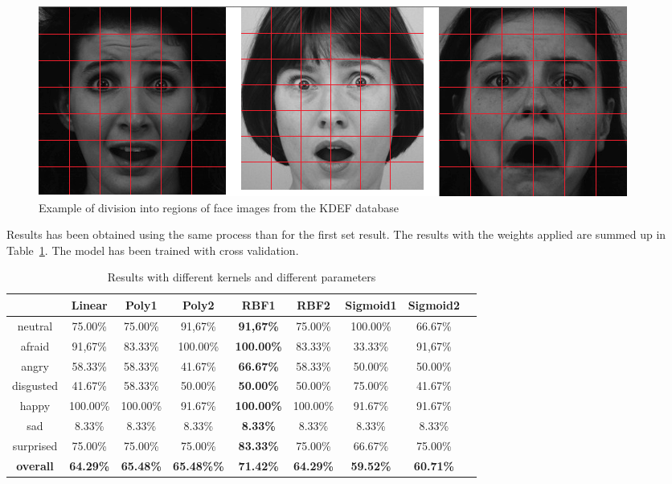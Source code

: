 \begin{figure}[!h]
\begin{center}
\noindent \includegraphics[scale=0.3]{figures/implementation_weight_example} 
\newline
\caption{Example of division into regions of face images from the KDEF database}
\label{implementation_weight_example}
\end{center} 
\end{figure}

\noindent Results has been obtained using the same process than for the first set result. The results with the weights applied are summed up in Table~\ref{table_results_kernels_weight}. The model has been trained with cross validation.
\newline

\begin{table}[h]
\begin{center}
   \caption{\label{table_results_kernels_weight} Results with different kernels and different parameters}
\begin{tabular}{|c|c|c|c|c|c|c|c|c|}
  \hline
    & Linear & \textbf{Poly1} & Poly2 & RBF1 & RBF2 & Sigmoid1 & Sigmoid2 \\
  \hline
  neutral & 75.00\% & 75.00\% & 91,67\% & \textbf{91,67\%} & 75.00\% & 100.00\% & 66.67\% \\
  afraid & 91,67\% & 83.33\% & 100.00\% & \textbf{100.00\%} & 83.33\% & 33.33\% & 91,67\% \\
  angry & 58.33\% & 58.33\% & 41.67\% & \textbf{66.67\%} & 58.33\% & 50.00\% & 50.00\% \\
  disgusted & 41.67\% & 58.33\% & 50.00\% & \textbf{50.00\%} & 50.00\% & 75.00\% & 41.67\% \\
  happy & 100.00\% & 100.00\% & 91.67\% & \textbf{100.00\%} & 100.00\% & 91.67\% & 91.67\% \\
  sad & 8.33\% & 8.33\% & 8.33\% & \textbf{8.33\%} & 8.33\% & 8.33\% & 8.33\% \\
  surprised & 75.00\% & 75.00\% & 75.00\% & \textbf{83.33\%} & 75.00\% & 66.67\% & 75.00\% \\
  \textbf{overall} & \textbf{64.29\%} & \textbf{65.48\%} & \textbf{{65.48\%}\%} & \textbf{{\color{red}71.42\%}} & \textbf{64.29\%} & \textbf{59.52\%} & \textbf{60.71\%} \\
  \hline
\end{tabular}
\end{center} 
\end{table}

